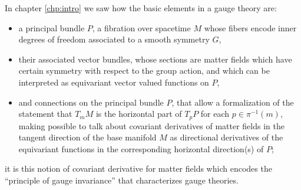 In chapter \ref{chp:intro} we saw how the basic elements in a gauge theory are:
    \begin{itemize}
        
    \item a principal bundle $P$, a fibration over spacetime $M$ whose fibers encode inner degrees of freedom associated to a smooth symmetry $G$,
    
    \item their associated vector bundles, whose sections are matter fields which have certain symmetry with respect to the group action, and which can be interpreted as equivariant vector valued functions on $P$,
    
    \item and connections on the principal bundle $P$, that allow a formalization of the statement that $T_m M$ is the horizontal part of $T_p P$ for each $p \in \pi^{-1}(m)$, making possible to talk about covariant derivatives of matter fields in the tangent direction of the base manifold $M$ as directional derivatives of the equivariant functions in the corresponding horizontal direction(s) of $P$;
    
    \end{itemize}
it is this notion of covariant derivative for matter fields which encodes the ``principle of gauge invariance'' that characterizes gauge theories.

